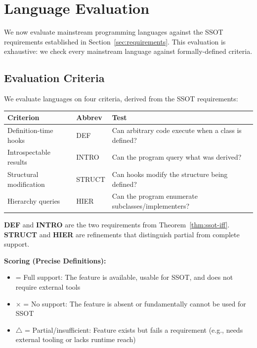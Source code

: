 \section{Language Evaluation}\label{sec:evaluation}

We now evaluate mainstream programming languages against the SSOT requirements established in Section~\ref{sec:requirements}. This evaluation is exhaustive: we check every mainstream language against formally-defined criteria.

\subsection{Evaluation Criteria}\label{sec:criteria}

We evaluate languages on four criteria, derived from the SSOT requirements:

\begin{center}
\begin{tabular}{llp{6cm}}
\toprule
\textbf{Criterion} & \textbf{Abbrev} & \textbf{Test} \\
\midrule
Definition-time hooks & DEF & Can arbitrary code execute when a class is defined? \\
Introspectable results & INTRO & Can the program query what was derived? \\
Structural modification & STRUCT & Can hooks modify the structure being defined? \\
Hierarchy queries & HIER & Can the program enumerate subclasses/implementers? \\
\bottomrule
\end{tabular}
\end{center}

\textbf{DEF} and \textbf{INTRO} are the two requirements from Theorem~\ref{thm:ssot-iff}. \textbf{STRUCT} and \textbf{HIER} are refinements that distinguish partial from complete support.

\textbf{Scoring (Precise Definitions):}
\begin{itemize}
\tightlist
\item \checkmark = Full support: The feature is available, usable for SSOT, and does not require external tools
\item $\times$ = No support: The feature is absent or fundamentally cannot be used for SSOT
\item $\triangle$ = Partial/insufficient: Feature exists but fails a requirement (e.g., needs external tooling or lacks runtime reach)
\end{itemize}

